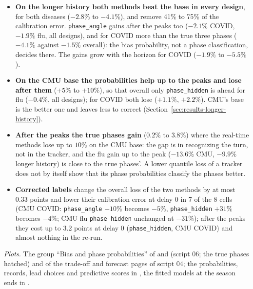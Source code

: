 \documentclass[11pt,a4paper]{article}
\theoremstyle{definition}
\theoremstyle{remark}
\begin{document}
\begin{itemize}[leftmargin=*,itemsep=3pt]
\item \textbf{On the longer history both methods beat the base in every
design}, for both diseases ($-2.8\%$ to $-4.1\%$), and remove 41\% to 75\% of
the calibration error. \texttt{phase\_angle} gains after the peaks too
($-2.1\%$ COVID, $-1.9\%$ flu, all designs), and for COVID more than the true
three phases ($-4.1\%$ against $-1.5\%$ overall): the bias probability, not
a phase classification, decides there. The gains grow with the horizon for
COVID ($-1.9\%$ to $-5.5\%$).
\item \textbf{On the CMU base the probabilities help up to the peaks and
lose after them} ($+5\%$ to $+10\%$), so that overall only
\texttt{phase\_hidden} is ahead for flu ($-0.4\%$, all designs); for COVID
both lose ($+1.1\%$, $+2.2\%$). CMU's base is the better one and leaves less
to correct (Section~\ref{sec:results-longer-history}).
\item \textbf{After the peaks the true phases gain} ($0.2\%$ to
$3.8\%$) where the real-time methods lose up to $10\%$ on the CMU base: the
gap is in recognizing the turn, not in the tracker, and the flu gain up to the
peak ($-13.6\%$ CMU, $-9.9\%$ longer history) is close to the true phases'.
A lower quantile loss of a tracker does not by itself show that its phase
probabilities classify the phases better.
\item \textbf{Corrected labels} change the overall loss of the two methods by at
most $0.33$ points and lower their calibration error at delay 0 in 7 of the 8
cells (CMU COVID: \texttt{phase\_angle} $+10\%$ becomes $-5\%$,
\texttt{phase\_hidden} $+31\%$ becomes $-4\%$; CMU flu \texttt{phase\_hidden}
unchanged at $-31\%$); after the peaks they cost up to $3.2$ points at delay 0
(\texttt{phase\_hidden}, CMU COVID) and almost nothing in the re-run.
\end{itemize}
\emph{Plots.} The group ``Bias and phase probabilities'' of
 and 
(script 06; the true phases hatched) and of the trade-off and forecast pages
of script 04; the probabilities, records, lead choices and predictive scores
in , the fitted models at the
season ends in .
\end{document}
